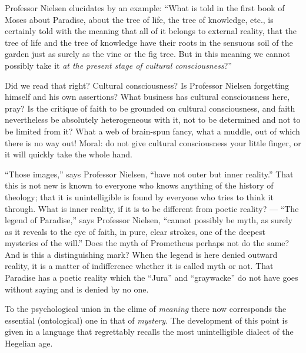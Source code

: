 \documentclass[12pt,a4paper,openany]{book}
\begin{document}
Professor Nielsen elucidates by an example: ``What is told in the first
book of Moses about Paradise, about the tree of life, the tree of
knowledge, etc., is certainly told with the meaning that all of it
belongs to external reality, that the tree of life and the tree of
knowledge have their roots in the sensuous soil of the garden just as
surely as the vine or the fig tree. But in this meaning we cannot
possibly take it \emph{at the present stage of cultural consciousness}?''

Did we read that right? Cultural consciousness? Is Professor Nielsen
forgetting himself and his own assertions? What business has cultural
consciousness here, pray? Is the critique of faith to be grounded on
cultural consciousness, and faith nevertheless be absolutely
heterogeneous with it, not to be determined and not to be limited from
it? What a web of brain-spun fancy, what a muddle, out of which there
is no way out! Moral: do not give cultural consciousness your little
finger, or it will quickly take the whole hand.

``Those images,'' says Professor Nielsen, ``have not outer but inner
reality.'' That this is not new is known to everyone who knows anything
of the history of theology; that it is unintelligible is found by
everyone who tries to think it through. What is inner reality, if it
is to be different from poetic reality? --- ``The legend of Paradise,''
says Professor Nielsen, ``cannot possibly be myth, as surely as it
reveals to the eye of faith, in pure, clear strokes, one of the deepest
mysteries of the will.'' Does the myth of Prometheus perhaps not do the
same? And is this a distinguishing mark? When the legend is here denied
outward reality, it is a matter of indifference whether it is called
myth or not. That Paradise has a poetic reality which the ``Jura'' and
``graywacke'' do not have goes without saying and is denied by no one.

To the psychological union in the clime of \emph{meaning} there now
corresponds the essential (ontological) one in that of \emph{mystery}. The
development of this point is given in a language that regrettably recalls
the most unintelligible dialect of the Hegelian age.
\end{document}
